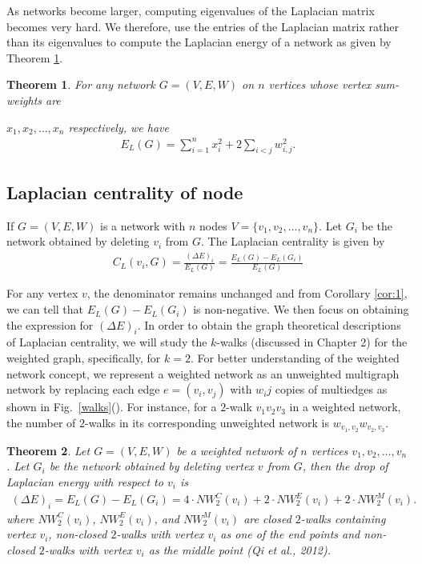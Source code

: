 \documentclass[10pt,a4paper]{article}
\newtheorem{thm}{Theorem}
\begin{document}
As networks become larger, computing eigenvalues of the Laplacian matrix becomes very hard. We therefore, use the entries of the Laplacian matrix rather than its eigenvalues to compute the Laplacian energy of a network as given by Theorem \ref{theorem:1}.
\begin{thm}
	For any network $G=(V,E,W)$ on $n$ vertices whose vertex sum-weights are  
	
	$x_1,x_2, \ldots, x_n$ respectively, we have
	\begin{eqnarray}
	E_L(G) = \sum_{i=1}^n x_i^2 + 2 \sum_{i<j} w_{i,j}^2.
	\end{eqnarray}
	\label{theorem:1}
\end{thm}

\subsection{Laplacian centrality of  node}
	If $G=(V,E,W)$ is a network with $n$ nodes $V=\{v_1,v_2,\ldots, v_n\}$. Let $G_i$ be the network obtained by deleting $v_i$ from $G$. The Laplacian centrality is given by
	\begin{eqnarray}
	C_L(v_i,G) = \frac{(\Delta E)_i}{E_L(G)} = \frac{E_L(G) - E_L(G_i)}{E_L(G)}
	\end{eqnarray} 

For any vertex $v$, the denominator remains unchanged and from Corollary \ref{cor:1}, we can tell that $E_L(G) - E_L(G_i)$ is non-negative. We then focus on obtaining the expression for $(\Delta E)_i$. In order to obtain the graph theoretical descriptions of Laplacian centrality, we will study the $k$-walks (discussed in Chapter 2) for the weighted graph, specifically, for $k=2$. For better understanding of the weighted network concept, we represent a weighted network as an unweighted multigraph network by replacing each edge $e=(v_i,v_j)$ with $w_ij$ copies of multiedges as shown in Fig.~\ref{walks}(). For instance, for a $2$-walk $v_1v_2v_3$ in a weighted network, the number of $2$-walks in its corresponding unweighted network is  $w_{v_1,v_2}w_{v_2,v_3}$. 

\begin{thm}
	Let $G=(V,E,W)$ be a weighted network of $n$ vertices ${v_1,v_2,\ldots,v_n}$. Let $G_i$ be the network obtained by deleting vertex $v$ from $G$, then the drop of Laplacian energy with respect to $v_i$ is
	\begin{eqnarray}
	(\Delta E)_i = E_L(G) -E_L(G_i) = 4 \cdot NW_2^C (v_i) + 2 \cdot NW_2^E (v_i) + 2 \cdot NW_2^M (v_i).
	\label{energychange}
	\end{eqnarray}
	where
	$NW_{2} ^C(v_i)$, $NW_{2} ^E(v_i)$, and $NW_{2} ^M(v_i)$ are closed $2$-walks containing vertex $v_i$, non-closed $2$-walks with vertex $v_i$ as one of the end points and non-closed $2$-walks with vertex $v_i$ as the middle point (Qi et al., 2012).
	\label{thm2}
\end{thm}
\end{document}
